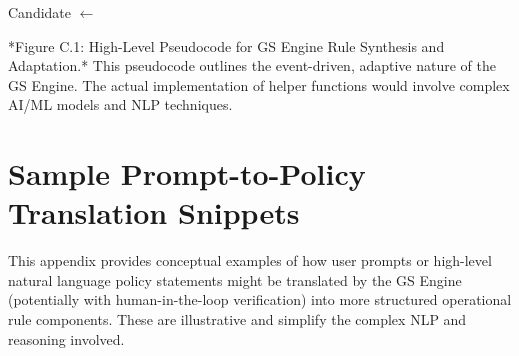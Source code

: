 \documentclass[sigconf,review,anonymous=false]{acmart} %
\begin{document}
\begin{algorithm}[H]
{{{{            Candidate $\leftarrow$ \;
            \;
        }
      }
    }
  }
\Indm
\end{algorithm}
*Figure C.1: High-Level Pseudocode for GS Engine Rule Synthesis and Adaptation.* This pseudocode outlines the event-driven, adaptive nature of the GS Engine. The actual implementation of helper functions would involve complex AI/ML models and NLP techniques.

\section{Sample Prompt-to-Policy Translation Snippets}
\label{app:prompt_to_policy}
This appendix provides conceptual examples of how user prompts or high-level natural language policy statements might be translated by the GS Engine (potentially with human-in-the-loop verification) into more structured operational rule components. These are illustrative and simplify the complex NLP and reasoning involved.
\end{document}
